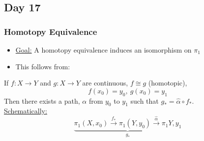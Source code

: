 \documentclass[../notes.tex]{subfiles}
\begin{document}
\subsection{Day 17}
\subsubsection{Homotopy Equivalence}
\begin{itemize}
    \item \underline{Goal:} A homotopy equivalence induces an isomorphism on $\pi_1$
    \item This follows from:
\end{itemize}
\begin{theorem}
    If $f: X\rightarrow Y$ and $g: X\rightarrow Y$ are continuous, $f\cong g$ (homotopic),
    \[
        f(x_0)=y_0,\ g(x_0)=y_1
    \]
    Then there exists a path, $\alpha$ from $y_0$ to $y_1$ such that 
    $g_* = \hat{\alpha}\circ f_*$.\\
    \underline{Schematically:}
    \[
        \underbrace{\pi_1(X,x_0)\xrightarrow{f_*}\pi_1(Y,y_0)
            \xrightarrow{\hat{{\alpha}}}\pi_1{Y,y_1}}_{g_*}
    \]
\end{theorem}
\end{document}
